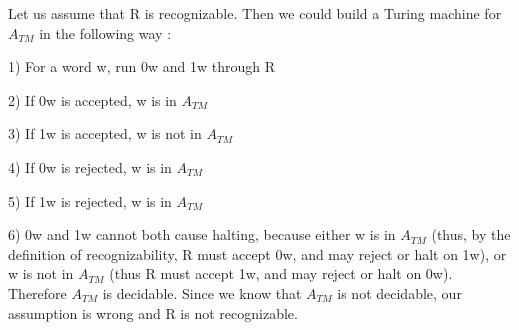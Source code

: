 

Let us assume that R is recognizable. Then we could build a Turing machine for $A_{TM}$ in the following way :

1) For a word w, run 0w and 1w through R

2) If 0w is accepted, w is in $A_{TM}$

3) If 1w is accepted, w is not in $A_{TM}$

4) If 0w is rejected, w is in $A_{TM}$

5) If 1w is rejected, w is in $A_{TM}$

6) 0w and 1w cannot both cause halting, because either w is in $A_{TM}$ (thus, by the definition of recognizability, R must accept 0w, and may reject or halt on 1w), or w is not in $A_{TM}$ (thus R must accept 1w, and may reject or halt on 0w). Therefore $A_{TM}$ is decidable. Since we know that $A_{TM}$ is not decidable, our assumption is wrong and R is not recognizable.
